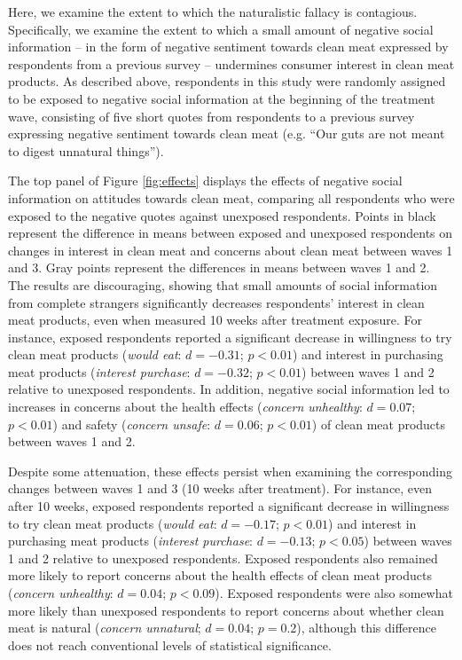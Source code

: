 \documentclass[12pt]{article}
\begin{document}
Here, we examine the extent to which the naturalistic fallacy is contagious. Specifically, we examine the extent to which a small amount of negative social information -- in the form of negative sentiment towards clean meat expressed by respondents from a previous survey -- undermines consumer interest in clean meat products. As described above, respondents in this study were randomly assigned to be exposed to negative social information at the beginning of the treatment wave, consisting of five short quotes from respondents to a previous survey expressing negative sentiment towards clean meat (e.g. ``Our guts are not meant to digest unnatural things'').

The top panel of Figure \ref{fig:effects} displays the effects of negative social information on attitudes towards clean meat, comparing all respondents who were exposed to the negative quotes against unexposed respondents. Points in black represent the difference in means between exposed and unexposed respondents on changes in interest in clean meat and concerns about clean meat between waves 1 and 3. Gray points represent the differences in means between waves 1 and 2. The results are discouraging, showing that small amounts of social information from complete strangers significantly decreases respondents' interest in clean meat products, even when measured 10 weeks after treatment exposure. For instance, exposed respondents reported a significant decrease in willingness to try clean meat products (\textit{would eat}: $d=-0.31$; $p < 0.01$) and interest in purchasing meat products (\textit{interest purchase}: $d=-0.32$; $p < 0.01$) between waves 1 and 2 relative to unexposed respondents. In addition, negative social information led to increases in concerns about the health effects (\textit{concern unhealthy}: $d=0.07$; $p < 0.01$) and safety (\textit{concern unsafe}: $d=0.06$; $p < 0.01$) of clean meat products between waves 1 and 2.

Despite some attenuation, these effects persist when examining the corresponding changes between waves 1 and 3 (10 weeks after treatment). For instance, even after 10 weeks, exposed respondents reported a significant decrease in willingness to try clean meat products (\textit{would eat}: $d=-0.17$; $p < 0.01$) and interest in purchasing meat products (\textit{interest purchase}: $d=-0.13$; $p < 0.05$) between waves 1 and 2 relative to unexposed respondents. Exposed respondents also remained more likely to report concerns about the health effects of clean meat products (\textit{concern unhealthy}: $d=0.04$; $p < 0.09$). Exposed respondents were also somewhat more likely than unexposed respondents to report concerns about whether clean meat is natural (\textit{concern unnatural}; $d=0.04$; $p = 0.2$), although this difference does not reach conventional levels of statistical significance.
\end{document}
